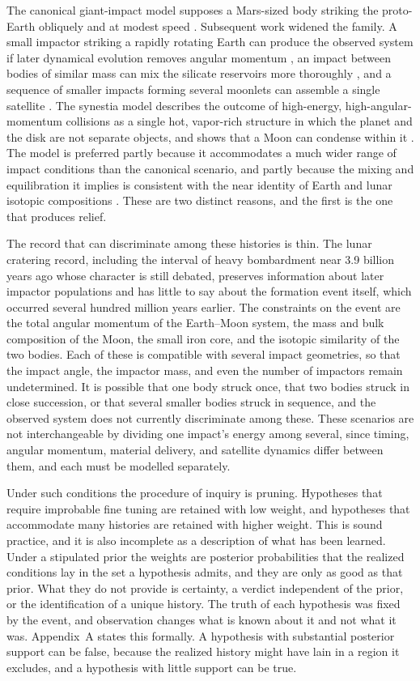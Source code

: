 \documentclass[11pt]{article}
\begin{document}
The canonical giant-impact model supposes a Mars-sized body striking the proto-Earth obliquely and at modest speed \cite{canup2001}. Subsequent work widened the family. A small impactor striking a rapidly rotating Earth can produce the observed system if later dynamical evolution removes angular momentum \cite{cuk2012}, an impact between bodies of similar mass can mix the silicate reservoirs more thoroughly \cite{canup2012}, and a sequence of smaller impacts forming several moonlets can assemble a single satellite \cite{rufu2017}. The synestia model describes the outcome of high-energy, high-angular-momentum collisions as a single hot, vapor-rich structure in which the planet and the disk are not separate objects, and shows that a Moon can condense within it \cite{lock2018}. The model is preferred partly because it accommodates a much wider range of impact conditions than the canonical scenario, and partly because the mixing and equilibration it implies is consistent with the near identity of Earth and lunar isotopic compositions \cite{pahlevan2007,young2016}. These are two distinct reasons, and the first is the one that produces relief.

The record that can discriminate among these histories is thin. The lunar cratering record, including the interval of heavy bombardment near 3.9 billion years ago whose character is still debated, preserves information about later impactor populations and has little to say about the formation event itself, which occurred several hundred million years earlier. The constraints on the event are the total angular momentum of the Earth--Moon system, the mass and bulk composition of the Moon, the small iron core, and the isotopic similarity of the two bodies. Each of these is compatible with several impact geometries, so that the impact angle, the impactor mass, and even the number of impactors remain undetermined. It is possible that one body struck once, that two bodies struck in close succession, or that several smaller bodies struck in sequence, and the observed system does not currently discriminate among these. These scenarios are not interchangeable by dividing one impact's energy among several, since timing, angular momentum, material delivery, and satellite dynamics differ between them, and each must be modelled separately.

Under such conditions the procedure of inquiry is pruning. Hypotheses that require improbable fine tuning are retained with low weight, and hypotheses that accommodate many histories are retained with higher weight. This is sound practice, and it is also incomplete as a description of what has been learned. Under a stipulated prior the weights are posterior probabilities that the realized conditions lay in the set a hypothesis admits, and they are only as good as that prior. What they do not provide is certainty, a verdict independent of the prior, or the identification of a unique history. The truth of each hypothesis was fixed by the event, and observation changes what is known about it and not what it was. Appendix~A states this formally. A hypothesis with substantial posterior support can be false, because the realized history might have lain in a region it excludes, and a hypothesis with little support can be true.
\end{document}
